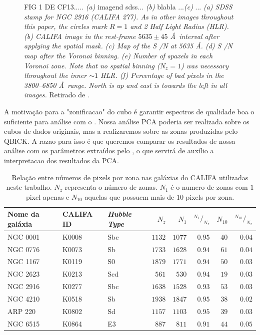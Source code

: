 \begin{figure}
    \caption[\ojo]
    {\ojo FIG 1 DE CF13..... {\em (a)} imagend sdss... {\em (b)} blabla ...{\em (c)} ...
    {\em (a) SDSS stamp for NGC 2916 (CALIFA 277). As in other images throughout this paper, the circles mark $R = 1$
    and 2 Half Light Radius (HLR). (b) CALIFA image in the rest-frame $5635 \pm 45$ \AA\ interval after applying the
    spatial mask. (c) Map of the S /N at 5635 \AA. (d) S /N map after the Voronoi binning. (e) Number of spaxels in each
    Voronoi zone. Note that no spatial binning ($N_z = 1$) was necessary throughout the inner $\sim 1$ HLR. (f)
    Percentage of bad pixels in the 3800--6850 \AA\ range. North is up and east is towards the left in all images.}
    Retirado de \citet{!!!}.}
   	\label{fig:Fig1DeCF13}
\end{figure}

A motivação para a "zonificacao"  do cubo é garantir espectros de qualidade boa o suficiente para análise com o
\starlight. Nossa análise PCA poderia ser realizada sobre os cubos de dados originais, mas a realizaremos sobre as zonas
produzidas pelo QBICK. A razao para isso é que queremos comparar os resultados de nossa análise com os parâmetros
extraídos pelo \starlight, o que servirá de auxílio a interpretacao dos resultados da PCA.

\begin{table}
	\caption[Relação de pixels e zonas em algumas galáxias do CALIFA]
	{Relação entre números de pixels por zona nas galáxias do CALIFA utilizadas
	neste trabalho. $N_z$ representa o número de zonas. $N_1$ é o numero de zonas
	com $1$ pixel apenas e $N_{10}$ aquelas que possuem mais de $10$ pixels por
	zona.}
	\begin{tabular}{l l l r r r r r}
		Nome da galáxia & CALIFA ID & {\em Hubble Type} & $N_z$ & $N_{1}$ &
		${}^{N_1}/_{N_z}$ & $N_{10}$ & ${}^{N_{10}}/_{N_z}$
		\\
		\midrule
		NGC 0001 & K0008 & Sbc & $1132$ & $1077$ & $0.95$ & $40$ & $0.04$ \\
		NGC 0776 & K0073 & Sb & $1733$ & $1628$ & $0.94$ & $61$ & $0.04$ \\
		NGC 1167 & K0119 & S0 & $1879$ & $1771$ & $0.94$ & $50$ & $0.03$ \\
		NGC 2623 & K0213 & Scd & $561$ & $530$ & $0.94$ & $19$ & $0.03$ \\
		NGC 2916 & K0277 & Sbc & $1638$ & $1528$ & $0.93$ & $53$ & $0.03$ \\
		NGC 4210 & K0518 & Sb & $1938$ & $1847$ & $0.95$ & $38$ & $0.02$ \\
		ARP 220 & K0802 & Sd & $1157$ & $1103$ & $0.95$ & $39$ & $0.03$ \\
		NGC 6515 & K0864 & E3 & $887$ & $811$ & $0.91$ & $44$ & $0.05$ \\
	\end{tabular}
	\label{tab:pixelZones}
\end{table}

